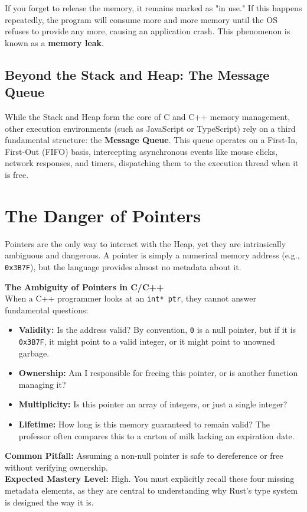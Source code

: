If you forget to release the memory, it remains marked as "in use." If this happens repeatedly, the program will consume more and more memory until the OS refuses to provide any more, causing an application crash. This phenomenon is known as a \textbf{memory leak}.

\subsection{Beyond the Stack and Heap: The Message Queue}
While the Stack and Heap form the core of C and C++ memory management, other execution environments (such as JavaScript or TypeScript) rely on a third fundamental structure: the \textbf{Message Queue}. This queue operates on a First-In, First-Out (FIFO) basis, intercepting asynchronous events like mouse clicks, network responses, and timers, dispatching them to the execution thread when it is free.

\section{The Danger of Pointers}

Pointers are the only way to interact with the Heap, yet they are intrinsically ambiguous and dangerous. A pointer is simply a numerical memory address (e.g., \texttt{0x3B7F}), but the language provides almost no metadata about it.

\begin{examprioritybox}
\textbf{The Ambiguity of Pointers in C/C++} \\
When a C++ programmer looks at an \texttt{int* ptr}, they cannot answer fundamental questions:
\begin{itemize}
    \item \textbf{Validity:} Is the address valid? By convention, \texttt{0} is a null pointer, but if it is \texttt{0x3B7F}, it might point to a valid integer, or it might point to unowned garbage.
    \item \textbf{Ownership:} Am I responsible for freeing this pointer, or is another function managing it?
    \item \textbf{Multiplicity:} Is this pointer an array of integers, or just a single integer?
    \item \textbf{Lifetime:} How long is this memory guaranteed to remain valid? The professor often compares this to a carton of milk lacking an expiration date.
\end{itemize}
\textbf{Common Pitfall:} Assuming a non-null pointer is safe to dereference or free without verifying ownership. \\
\textbf{Expected Mastery Level:} High. You must explicitly recall these four missing metadata elements, as they are central to understanding why Rust's type system is designed the way it is.
\end{examprioritybox}

